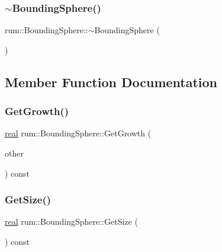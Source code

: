 \mbox{\label{classrum_1_1_bounding_sphere_a2a6e3e469ebaa4a783cc0688c065d171}} 
\subsubsection{\texorpdfstring{$\sim$\+Bounding\+Sphere()}{~BoundingSphere()}}
{\footnotesize\ttfamily rum\+::\+Bounding\+Sphere\+::$\sim$\+Bounding\+Sphere (\begin{DoxyParamCaption}{ }\end{DoxyParamCaption})}



\subsection{Member Function Documentation}
\mbox{\label{classrum_1_1_bounding_sphere_a69dfe111291edb351c1b316818fd136e}} 
\subsubsection{\texorpdfstring{Get\+Growth()}{GetGrowth()}}
{\footnotesize\ttfamily \hyperlink{namespacerum_a7e8cca23573d5eaead0f138cbaa4862c}{real} rum\+::\+Bounding\+Sphere\+::\+Get\+Growth (\begin{DoxyParamCaption}\item[{const \hyperlink{classrum_1_1_bounding_sphere}{Bounding\+Sphere} \&}]{other }\end{DoxyParamCaption}) const}

\mbox{\label{classrum_1_1_bounding_sphere_ab1921b42cca30a1c9deb3bee24c6d423}} 
\subsubsection{\texorpdfstring{Get\+Size()}{GetSize()}}
{\footnotesize\ttfamily \hyperlink{namespacerum_a7e8cca23573d5eaead0f138cbaa4862c}{real} rum\+::\+Bounding\+Sphere\+::\+Get\+Size (\begin{DoxyParamCaption}{ }\end{DoxyParamCaption}) const}

